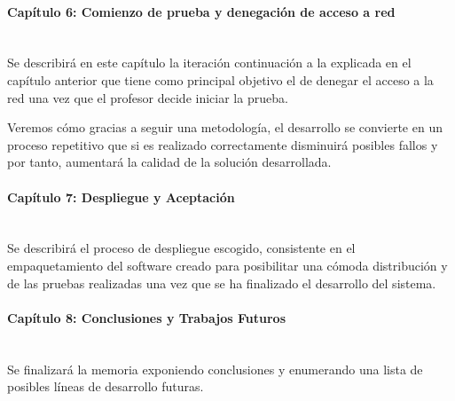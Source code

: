 \paragraph{Capítulo 6: Comienzo de prueba y denegación de acceso a red} \ \\

Se describirá en este capítulo la iteración continuación a la explicada en el capítulo anterior que tiene como principal objetivo el de denegar el acceso a la red una vez que el profesor decide iniciar la prueba.
\newline

Veremos cómo gracias a seguir una metodología, el desarrollo se convierte en un proceso repetitivo que si es realizado correctamente disminuirá posibles fallos y por tanto, aumentará la calidad de la solución desarrollada.


\paragraph{Capítulo 7: Despliegue y Aceptación} \ \\


Se describirá el proceso de despliegue escogido, consistente en el empaquetamiento del software creado para posibilitar una cómoda distribución y de las pruebas realizadas una vez que se ha finalizado el desarrollo del sistema.


\paragraph{Capítulo 8: Conclusiones y Trabajos Futuros} \ \\

Se finalizará la memoria exponiendo conclusiones y enumerando una lista de posibles líneas de desarrollo futuras. 